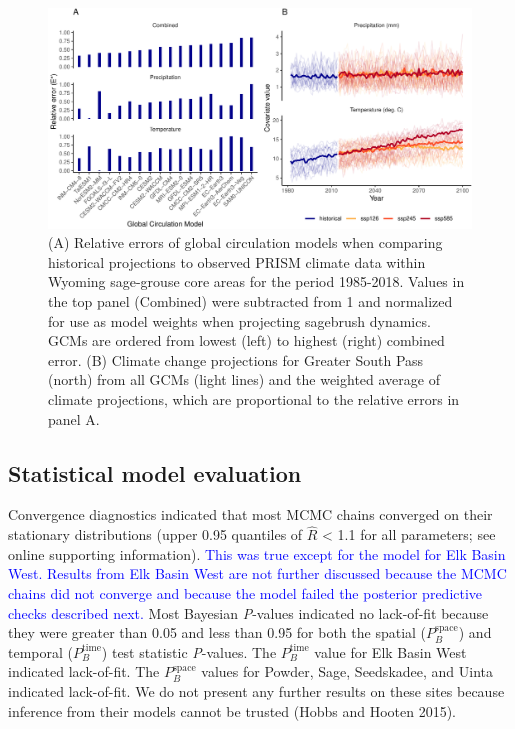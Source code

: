 \documentclass[
  12pt,
]{article}
\begin{document}
\begin{figure}
\centering
\includegraphics{sageCastManuscript_files/figure-latex/gcm-ranks-1.pdf}
\caption{\label{fig:gcm-ranks}(A) Relative errors of global circulation models when comparing historical projections to observed PRISM climate data within Wyoming sage-grouse core areas for the period 1985-2018. Values in the top panel (Combined) were subtracted from 1 and normalized for use as model weights when projecting sagebrush dynamics. GCMs are ordered from lowest (left) to highest (right) combined error. (B) Climate change projections for Greater South Pass (north) from all GCMs (light lines) and the weighted average of climate projections, which are proportional to the relative errors in panel A.}
\end{figure}

\hypertarget{statistical-model-evaluation}{%
\subsection{Statistical model evaluation}\label{statistical-model-evaluation}}

Convergence diagnostics indicated that most MCMC chains converged on their stationary distributions (upper 0.95 quantiles of \(\hat{R}\) \textless{} 1.1 for all parameters; see online supporting information).
\textcolor{blue}{This was true except for the model for Elk Basin West.}
\textcolor{blue}{Results from Elk Basin West are not further discussed because the MCMC chains did not converge and because the model failed the posterior predictive checks described next.}
Most Bayesian \emph{P}-values indicated no lack-of-fit because they were greater than 0.05 and less than 0.95 for both the spatial (\(P_B^{\text{space}}\)) and temporal (\(P_B^{\text{time}}\)) test statistic \emph{P}-values.
The \(P_B^{\text{time}}\) value for Elk Basin West indicated lack-of-fit.
The \(P_B^{\text{space}}\) values for Powder, Sage, Seedskadee, and Uinta indicated lack-of-fit.
We do not present any further results on these sites because inference from their models cannot be trusted (Hobbs and Hooten 2015).
\end{document}

